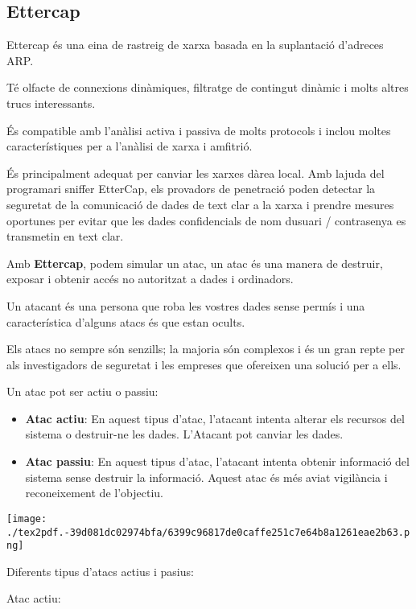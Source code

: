 \documentclass[]{article}
\begin{document}
\hypertarget{ettercap}{%
\subsection{\texorpdfstring{\textbf{Ettercap}}{Ettercap}}\label{ettercap}}

Ettercap és una eina de rastreig de xarxa basada en la suplantació
d'adreces ARP.

Té olfacte de connexions dinàmiques, filtratge de contingut dinàmic i
molts altres trucs interessants.

És compatible amb l'anàlisi activa i passiva de molts protocols i inclou
moltes característiques per a l'anàlisi de xarxa i amfitrió.

És principalment adequat per canviar les xarxes dàrea local. Amb lajuda
del programari sniffer EtterCap, els provadors de penetració poden
detectar la seguretat de la comunicació de dades de text clar a la xarxa
i prendre mesures oportunes per evitar que les dades confidencials de
nom dusuari / contrasenya es transmetin en text clar.

Amb \textbf{Ettercap}, podem simular un atac, un atac és una manera de
destruir, exposar i obtenir accés no autoritzat a dades i ordinadors.

Un atacant és una persona que roba les vostres dades sense permís i una
característica d'alguns atacs és que estan ocults.

Els atacs no sempre són senzills; la majoria són complexos i és un gran
repte per als investigadors de seguretat i les empreses que ofereixen
una solució per a ells.

Un atac pot ser actiu o passiu:

\begin{itemize}
\item
  \textbf{Atac actiu}: En aquest tipus d'atac, l'atacant intenta alterar
  els recursos del sistema o destruir-ne les dades. L'Atacant pot
  canviar les dades.
\item
  \textbf{Atac passiu}: En aquest tipus d'atac, l'atacant intenta
  obtenir informació del sistema sense destruir la informació. Aquest
  atac és més aviat vigilància i reconeixement de l'objectiu.
\end{itemize}

\texttt{[image: ./tex2pdf.-39d081dc02974bfa/6399c96817de0caffe251c7e64b8a1261eae2b63.png]}

Diferents tipus d'atacs actius i pasius:

Atac actiu:
\end{document}
